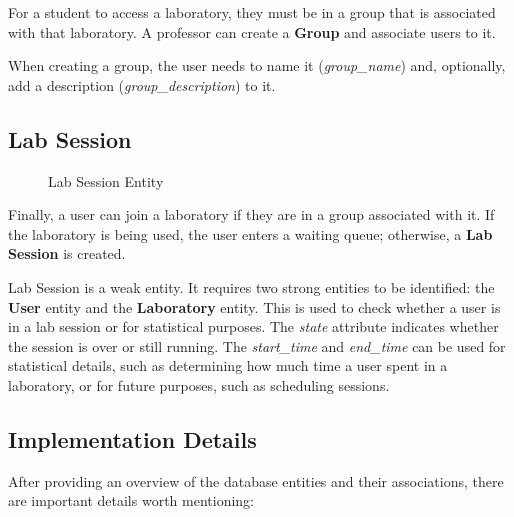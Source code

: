 For a student to access a laboratory, they must be in a group that is associated with that laboratory. A professor can create a \textbf{Group} and associate users to it.

When creating a group, the user needs to name it (\textit{group\_name}) and, optionally, add a description (\textit{group\_description}) to it.

\subsection*{Lab Session}

\begin{figure}[H]
    \begin{center}
    \end{center}
    \caption{Lab Session Entity}
    \label{fig:lab_session_entity}
\end{figure}

Finally, a user can join a laboratory if they are in a group associated with it. If the laboratory is being used, the user enters a waiting queue; otherwise, a \textbf{Lab Session} is created.

Lab Session is a weak entity. It requires two strong entities to be identified: the \textbf{User} entity and the \textbf{Laboratory} entity. This is used to check whether a user is in a lab session or for statistical purposes. The \textit{state} attribute indicates whether the session is over or still running. The \textit{start\_time} and \textit{end\_time} can be used for statistical details, such as determining how much time a user spent in a laboratory, or for future purposes, such as scheduling sessions.

\subsection{Implementation Details}
After providing an overview of the database entities and their associations, there are important details worth mentioning:

